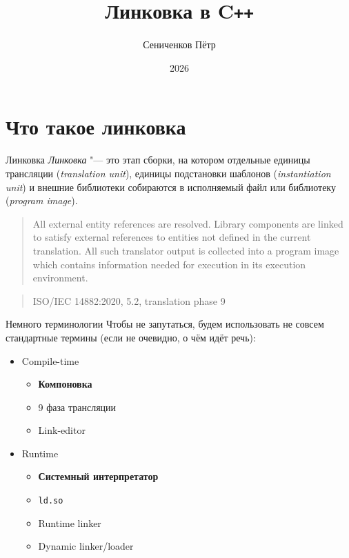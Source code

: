 \documentclass{beamer}
\title{Линковка в C\texttt{++}}
\author{Сениченков Пётр}
\date{2026}
\begin{document}
\frame{\titlepage}

\section{Что такое линковка}

\begin{frame}{Линковка}
    \emph{Линковка} "--- это этап сборки, на котором отдельные единицы трансляции
    (\emph{translation unit}), единицы подстановки шаблонов
    (\emph{instantiation unit}) и внешние библиотеки собираются в исполняемый файл или
    библиотеку (\emph{program image}).


    \pause
    \begin{quote}
        All external entity references are resolved.
        Library components are linked to satisfy external references to entities not defined in the
        current translation.
        All such translator output is collected into a program image which contains information
        needed for execution in its execution environment.
    \end{quote}
    \begin{quote}
        \raggedleft
        ISO/IEC 14882:2020, 5.2, translation phase 9
    \end{quote}
\end{frame}

\begin{frame}{Немного терминологии}
    Чтобы не запутаться, будем использовать не совсем стандартные термины (если не очевидно, о чём
    идёт речь):
    \begin{itemize}
        \item Compile-time
            \begin{itemize}
                \item \textbf{Компоновка}
                \item 9 фаза трансляции
                \item Link-editor
            \end{itemize}
        \item Runtime
            \begin{itemize}
                \item \textbf{Системный интерпретатор}
                \item \texttt{ld.so}
                \item Runtime linker
                \item Dynamic linker/loader
            \end{itemize}
    \end{itemize}
\end{frame}
\end{document}
